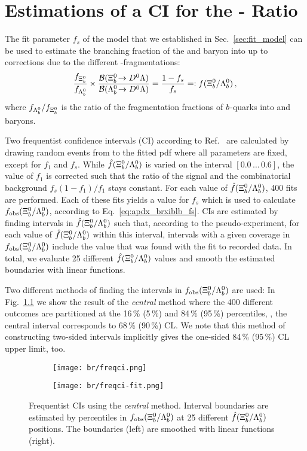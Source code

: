 \chapter{Estimations of a CI for the \texorpdfstring{\Xibz-\Lb}{Ξb-Λb} Ratio}
\label{chap:apdx_brxiblb}
The fit parameter $f_s$ of the model that we established in Sec.~\ref{sec:fit_model} can be used to estimate the branching fraction of the \Xibz and \Lb baryon into \Dz\Lz up to corrections due to the different \bquark-fragmentations:
\begin{equation}
    \label{eq:apdx_brxiblb_fs}
    \frac{f_{{{\Xi}^0_{b}}}}{f_{{{\Lambda}^0_{b}}}} \times \frac{{\mathcal{B}}({{\Xi}^0_{b}}\!\rightarrow {\ensuremath{{D}^0}}{\ensuremath{\Lambda}})}{{\mathcal{B}}({{\Lambda}^0_{b}}\!\rightarrow {\ensuremath{{D}^0}}{\ensuremath{\Lambda}})} = \frac{1 - f_s}{f_s} =: f({{\Xi}^0_{b}}/{{\Lambda}^0_{b}}) \,,
\end{equation}
where $f_{{{\Lambda}^0_{b}}} / f_{{{\Xi}^0_{b}}}$ is the ratio of the fragmentation fractions of ${b}$-quarks into \Lb and \Xibz baryons.

Two frequentist confidence intervals (CI) according to Ref.~\cite{NeymanPearson} are calculated by drawing random events from to the fitted \gls{pdf} where all parameters are fixed, except for $f_1$ and $f_s$.
While $\hat f({{\Xi}^0_{b}}/{{\Lambda}^0_{b}})$ is varied on the interval $[0.0 \, \ldots \, 0.6]$, the value of $f_1$ is corrected such that the ratio of the \Lb signal and the combinatorial background $f_s (1 - f_1) / f_1$ stays constant.
For each value of $\hat f({{\Xi}^0_{b}}/{{\Lambda}^0_{b}})$, 400 fits are performed.
Each of these fits yields a value for $f_s$ which is used to calculate $f_\text{obs}({{\Xi}^0_{b}}/{{\Lambda}^0_{b}})$, according to Eq.~\eqref{eq:apdx_brxiblb_fs}.
CIs are estimated by finding intervals in $\hat f({{\Xi}^0_{b}}/{{\Lambda}^0_{b}})$ such that, according to the pseudo-experiment, for each value of $\hat f({{\Xi}^0_{b}}/{{\Lambda}^0_{b}})$ within this interval, intervals with a given coverage in $f_\text{obs}({{\Xi}^0_{b}}/{{\Lambda}^0_{b}})$ include the value that was found with the fit to recorded data.
In total, we evaluate 25 different $\hat f({{\Xi}^0_{b}}/{{\Lambda}^0_{b}})$ values and smooth the estimated boundaries with linear functions.

Two different methods of finding the intervals in $f_\text{obs}({{\Xi}^0_{b}}/{{\Lambda}^0_{b}})$ are used:
In Fig.~\ref{fig:apdx_brxiblb_freqci_central} we show the result of the \textit{central} method where the 400 different outcomes are partitioned at the 16\,\% (5\,\%) and 84\,\% (95\,\%) percentiles, \ie{}, the central interval corresponds to 68\,\% (90\,\%) CL.
We note that this method of constructing two-sided intervals implicitly gives the one-sided 84\,\% (95\,\%) CL upper limit, too.
\begin{figure}[htbp]
    \centering
    \begin{subfigure}{.49\textwidth}
        \centering
        \texttt{[image: br/freqci.png]}
    \end{subfigure}
    \begin{subfigure}{.49\textwidth}
        \centering
        \texttt{[image: br/freqci-fit.png]}
    \end{subfigure}
    \caption{Frequentist CIs using the \textit{central} method. Interval boundaries are estimated by percentiles in $f_\text{obs}({{\Xi}^0_{b}}/{{\Lambda}^0_{b}})$ at 25 different $\hat f({{\Xi}^0_{b}}/{{\Lambda}^0_{b}})$ positions. The boundaries (left) are smoothed with linear functions (right).}
    \label{fig:apdx_brxiblb_freqci_central}
\end{figure}

